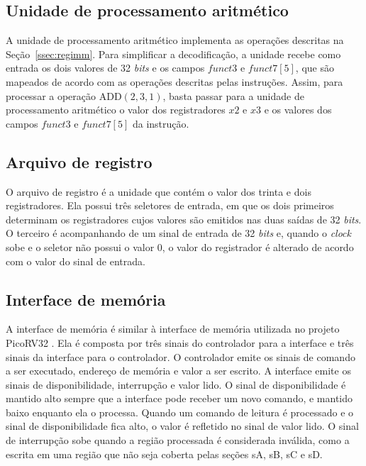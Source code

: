\subsection{Unidade de processamento aritmético}
\label{ssec:upa}

A unidade de processamento aritmético implementa as operações descritas na Seção~\ref{ssec:regimm}. Para simplificar
a decodificação, a unidade recebe como entrada os dois valores de 32 \emph{bits} e os campos $funct3$ e $funct7[5]$, que
são mapeados de acordo com as operações descritas pelas instruções. Assim, para processar a operação ADD$(2, 3, 1)$,
basta passar para a unidade de processamento aritmético o valor dos registradores $x2$ e $x3$ e os valores dos
campos $funct3$ e $funct7[5]$ da instrução.

\subsection{Arquivo de registro}
\label{ssec:memfile}

O arquivo de registro é a unidade que contém o valor dos trinta e dois registradores. Ela possui três seletores de entrada, em que
os dois primeiros determinam os registradores cujos valores são emitidos nas duas saídas de 32 \emph{bits}. O terceiro
é acompanhando de um sinal de entrada de 32 \emph{bits} e, quando o \emph{clock} sobe e o seletor não possui o valor 0,
o valor do registrador é alterado de acordo com o valor do sinal de entrada.

\subsection{Interface de memória}
\label{ssec:memint}

A interface de memória é similar à interface de memória utilizada no projeto PicoRV32 \citep{picorv}.
Ela é composta por três sinais do controlador para a interface e três sinais da interface para o controlador.
O controlador emite os sinais de comando a ser executado, endereço de memória e valor a ser escrito.
A interface emite os sinais de disponibilidade, interrupção e valor lido.
O sinal de disponibilidade é mantido alto sempre que a interface pode receber um novo comando, e
mantido baixo enquanto ela o processa. Quando um comando de leitura é processado e o sinal de
disponibilidade fica alto, o valor é refletido no sinal de valor lido. O sinal de interrupção
sobe quando a região processada é considerada inválida, como a escrita em uma região que não seja
coberta pelas seções sA, sB, sC e sD.

